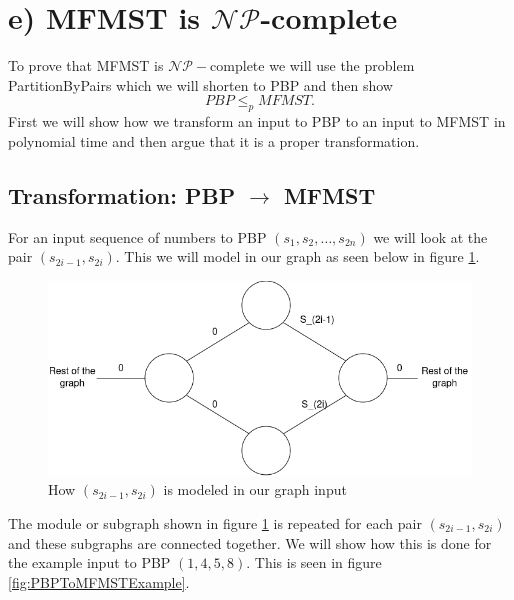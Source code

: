 \section*{e) MFMST is $\mathcal{NP}$-complete}
To prove that MFMST is $\mathcal{NP}-$complete we will use the problem PartitionByPairs which we will shorten to PBP and then show
\[
    PBP\leq_p MFMST.
\]
First we will show how we transform an input to PBP to an input to MFMST in polynomial time and then argue that it is a proper transformation.

\subsection*{Transformation: PBP $\rightarrow$ MFMST}
For an input sequence of numbers to PBP $(s_1,s_2,\dots, s_{2n})$ we will look at the pair $(s_{2i-1},s_{2i})$. This we will model in our graph as seen below in figure \ref{fig:PBPToMFMST}.

\begin{figure}[ht!]
    \centering
    \includegraphics[width=0.6\linewidth]{Latex/Billeder/PBPToMFMST.png}
    \caption{How $(s_{2i-1},s_{2i})$ is modeled in our graph input}
    \label{fig:PBPToMFMST}
\end{figure}

The module or subgraph shown in figure \ref{fig:PBPToMFMST} is repeated for each pair $(s_{2i-1},s_{2i})$ and these subgraphs are connected together. We will show how this is done for the example input to PBP $(1,4,5,8)$. This is seen in figure \ref{fig:PBPToMFMSTExample}. 

